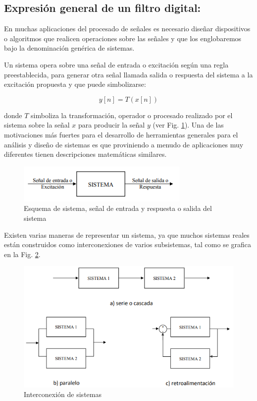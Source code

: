 \documentclass[conference]{IEEEtran}
\begin{document}
\subsection{Expresión general de un filtro digital:}
\label{sec:org885f7ba}

En muchas aplicaciones del procesado de señales es necesario diseñar dispositivos o algoritmos que realicen operaciones sobre las señales y que los englobaremos bajo la denominación genérica de sistemas.

Un sistema opera sobre una señal de entrada o excitación según una regla preestablecida, para generar otra señal llamada salida o respuesta del sistema a la  excitación propuesta y que puede simbolizarse:

\begin{equation}
    y[n] = T(x[n])
\end{equation}

donde \(T\) simboliza la transformación, operador o procesado realizado por el sistema sobre la señal \(x\) para producir la señal \(y\) (ver Fig. \ref{fig:esquemaFiltro}). Una de las motivaciones más fuertes para el desarrollo de herramientas generales para el análisis y diseño de sistemas es que proviniendo a menudo de aplicaciones muy diferentes tienen descripciones matemáticas similares.

\begin{figure}[htbp]
\centering
\includegraphics[width=.9\linewidth]{../images/esquemaFiltro.png}
\caption{\label{fig:esquemaFiltro}Esquema de sistema, señal de entrada y respuesta o salida del sistema}
\end{figure}

Existen varias maneras de representar un sistema, ya que muchos sistemas reales están construidos como interconexiones de varios subsistemas, tal como se grafica en la Fig. \ref{fig:interconexionSistema}.

\begin{figure}[htbp]
\centering
\includegraphics[width=.9\linewidth]{../images/interconexionSistema.png}
\caption{\label{fig:interconexionSistema}Interconexión de sistemas}
\end{figure}
\end{document}
